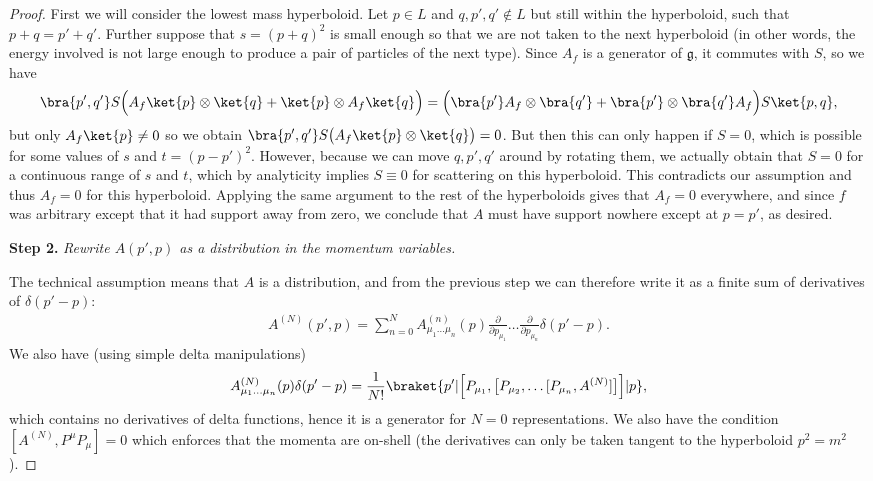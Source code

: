 \begin{proof}
First we will consider the lowest mass hyperboloid. Let $p \in L$ and $q,p',q'\notin L$ but still within the hyperboloid, such that $p + q  = p' + q'$. Further suppose that $s = (p + q)^2$ is small enough so that we are not taken to the next hyperboloid (in other words, the energy involved is not large enough to produce a   pair of particles of the next type). Since $A_f$ is a generator of $\mathfrak{g}$, it commutes with $S$, so we have \begin{align}
    \bra{p',q'} S\Big(A_f\ket{p}\otimes \ket{q} + \ket{p}\otimes A_f\ket{q}\Big) = \Big( \bra{p'}A_f\otimes \bra{q'} +  \bra{p'}\otimes \bra{q'}A_f\Big)S\ket{p,q},
\end{align} but only $A_f\ket{p}\neq 0$ so we obtain $ \bra{p',q'} S\big(A_f\ket{p}\otimes \ket{q} \big) = 0$. But then this can only happen if $S =0$, which is possible for some values of $s$ and $t = (p - p')^2$. However,  because we can move $q,p',q'$ around by rotating them, we actually obtain that $S = 0$ for a continuous range of $s$ and $t$, which by analyticity implies $S \equiv 0$ for scattering on this hyperboloid. This contradicts our assumption and thus $A_f = 0$ for this hyperboloid. Applying the same argument to the rest of the hyperboloids gives that $A_f = 0$ everywhere, and since $f$ was arbitrary except that it had support away from zero, we conclude that $A$ must have support nowhere except at $ p = p'$, as desired.

\vspace{3pt}
\noindent \textbf{Step 2.} \textit{Rewrite $A(p',p)$ as a distribution in the  momentum variables.} 
\vspace{2pt} 



The technical assumption means that $A$ is a distribution, and from the previous step we can therefore write it as a finite sum of derivatives of  $\delta(p' - p)$: \begin{align}
    A^{(N)}(p',p)=  \sum_{n = 0}^N A^{(n)}_{\mu_1\dots\mu_n}(p) \frac{\partial}{\partial p_{\mu_1}}\dots \frac{\partial}{\partial p_{\mu_n}} \delta( p' - p).
\end{align} We also have (using simple delta manipulations) \begin{align}\label{AAA}
     A^{(N)}_{\mu_1\dots\mu_n}(p) \delta( p' - p) = \frac{1}{N!}\braket{p'|\Big[P_{\mu_1},\big[P_{\mu_2},\dots [P_{\mu_n},A^{(N)}]\big]\Big]|p},
\end{align}  which contains no derivatives of delta functions, hence it is a generator for $N = 0$ representations. We also have the condition  $    [A^{(N)}, P^\mu P_\mu]  = 0 $ which enforces that the momenta are on-shell (the derivatives can only be taken tangent to the hyperboloid $p^2 = m^2$). 


\end{proof}
